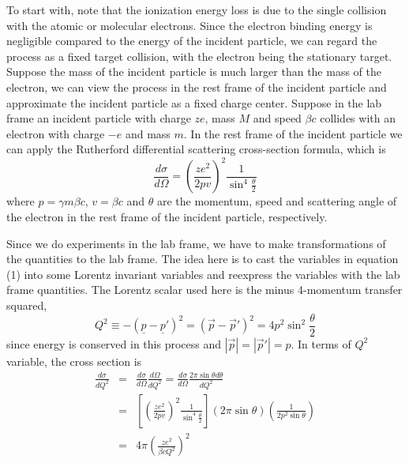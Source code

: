 \documentclass[11pt]{article} %
\begin{document}
To start with, note that the ionization energy loss is due to the single collision with the atomic or molecular electrons. Since the electron binding energy is negligible compared to the energy of the incident particle, we can regard the process as a fixed target collision, with the electron being the stationary target. Suppose the mass of the incident particle is much larger than the mass of the electron, we can view the process in the rest frame of the incident particle and approximate the incident particle as a fixed charge center. Suppose in the lab frame an incident particle with charge $ze$, mass $M$ and speed $\beta c$ collides with an electron with charge $-e$ and mass $m$. In the rest frame of the incident particle we can apply the Rutherford differential scattering cross-section formula, which is
\begin{equation}
\frac{d\sigma}{d\Omega}=\left( \frac{ze^2}{2pv} \right)^2 \frac{1}{\sin^4\frac{\theta}{2}}
\end{equation}
where $p=\gamma m\beta c$, $v=\beta c$ and $\theta$ are the momentum, speed and scattering angle of the electron in the rest frame of the incident particle, respectively.

Since we do experiments in the lab frame, we have to make transformations of the quantities to the lab frame. The idea here is to cast the variables in equation (1) into some Lorentz invariant variables and reexpress the variables with the lab frame quantities. The Lorentz scalar used here is the minus 4-momentum transfer squared,
\begin{equation}
Q^2\equiv-(\underline{p}-\underline{p}')^2=(\vec{p}-\vec{p}')^2=4p^2\sin^2\frac{\theta}{2}
\end{equation}
since energy is conserved in this process and $|\vec{p}|=|\vec{p}'|=p$. In terms of $Q^2$ variable, the cross section is
\begin{eqnarray}
\frac{d\sigma}{dQ^2} &=& \frac{d\sigma}{d\Omega}\frac{d\Omega}{dQ^2} = \frac{d\sigma}{d\Omega}\frac{2\pi\sin\theta d\theta}{dQ^2}\nonumber \\
&=& \left[\left( \frac{ze^2}{2pv} \right)^2 \frac{1}{\sin^4\frac{\theta}{2}}\right] (2\pi\sin\theta)\left( \frac{1}{2p^2\sin\theta} \right) \nonumber \\
&=& 4\pi\left( \frac{ze^2}{\beta cQ^2} \right)^2
\end{eqnarray}
\end{document}
